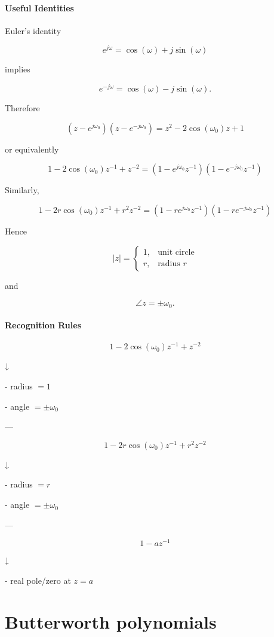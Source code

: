 
\paragraph{Useful Identities}

Euler's identity

\[
e^{j\omega}
=
\cos(\omega)+j\sin(\omega)
\]

implies

\[
e^{-j\omega}
=
\cos(\omega)-j\sin(\omega).
\]

Therefore

\[
\boxed{
(z-e^{j\omega_0})
(z-e^{-j\omega_0})
=
z^2-2\cos(\omega_0)z+1
}
\]

or equivalently

\[
\boxed{
1-2\cos(\omega_0)z^{-1}+z^{-2}
=
(1-e^{j\omega_0}z^{-1})
(1-e^{-j\omega_0}z^{-1})
}
\]

Similarly,

\[
\boxed{
1-2r\cos(\omega_0)z^{-1}+r^2z^{-2}
=
(1-re^{j\omega_0}z^{-1})
(1-re^{-j\omega_0}z^{-1})
}
\]

Hence

\[
|z|=
\begin{cases}
1,&\text{unit circle}\\
r,&\text{radius }r
\end{cases}
\]

and

\[
\angle z=\pm\omega_0.
\]

\paragraph{Recognition Rules}

\[
1-2\cos(\omega_0)z^{-1}+z^{-2}
\]

↓

- radius \(=1\)

- angle \(=\pm\omega_0\)

---

\[
1-2r\cos(\omega_0)z^{-1}+r^2z^{-2}
\]

↓

- radius \(=r\)

- angle \(=\pm\omega_0\)

---

\[
1-az^{-1}
\]

↓

- real pole/zero at \(z=a\)
\section{Butterworth polynomials}\label{app:Butterworth}

